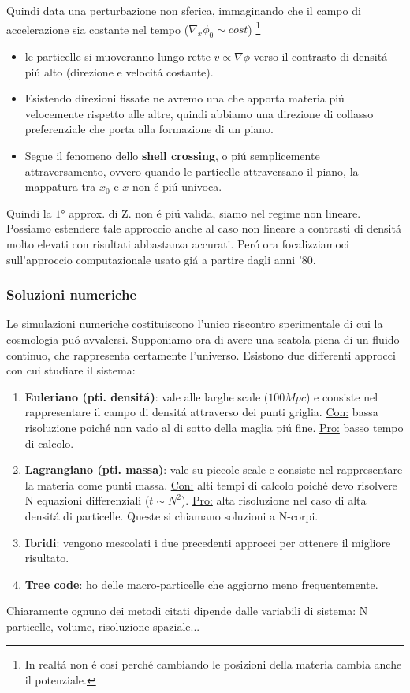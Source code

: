 \documentclass[12pt, a4paper]{article}
\begin{document}
Quindi data una perturbazione non sferica, immaginando che il campo di accelerazione sia costante nel tempo ($\nabla_x \phi_0 \sim cost$) \footnote{In realt\'{a} non \'{e} cos\'{i} perch\'{e} cambiando le posizioni della materia cambia anche il potenziale.} 
\begin{itemize}
\item le particelle si muoveranno lungo rette $v\propto \nabla\phi$ verso il contrasto di densit\'{a} pi\'{u} alto (direzione e velocit\'{a} costante). 
\item Esistendo direzioni fissate ne avremo una che apporta materia pi\'{u} velocemente rispetto alle altre, quindi abbiamo una direzione di collasso preferenziale che porta alla formazione di un piano.
\item Segue il fenomeno dello \textbf{shell crossing}, o pi\'{u} semplicemente attraversamento, ovvero quando le particelle attraversano il piano, la mappatura tra $x_0$ e $x$ non \'{e} pi\'{u} univoca.
\end{itemize}
Quindi la $1°$ approx. di Z. non \'{e} pi\'{u} valida, siamo nel regime non lineare. Possiamo estendere tale approccio anche al caso non lineare a contrasti di densit\'{a} molto elevati con risultati abbastanza accurati. Per\'{o} ora focalizziamoci sull'approccio computazionale usato gi\'{a} a partire dagli anni '80.
\subsubsection{Soluzioni numeriche}
Le simulazioni numeriche costituiscono l'unico riscontro sperimentale di cui la cosmologia pu\'{o} avvalersi. Supponiamo ora  di avere una scatola piena di un fluido continuo, che rappresenta certamente l'universo. Esistono due differenti approcci con cui studiare il sistema:
\begin{enumerate}
\item \textbf{Euleriano (pti. densit\'{a})}: vale alle larghe scale ($100 Mpc$) e consiste nel rappresentare il campo di densit\'{a} attraverso dei punti griglia. \underline{Con:} bassa risoluzione poich\'{e} non vado al di sotto della maglia pi\'{u} fine. \underline{Pro:} basso tempo di calcolo. 
\item \textbf{Lagrangiano (pti. massa)}: vale su piccole scale e consiste nel rappresentare la materia come punti massa. \underline{Con:} alti tempi di calcolo poich\'{e} devo risolvere N equazioni differenziali ($t\sim N^2$). \underline{Pro:} alta risoluzione nel caso di alta densit\'{a} di particelle. Queste si chiamano soluzioni a N-corpi.
\item \textbf{Ibridi}: vengono mescolati i due precedenti approcci per ottenere il migliore risultato.
\item \textbf{Tree code}: ho delle macro-particelle che aggiorno meno frequentemente.
\end{enumerate}
Chiaramente ognuno dei metodi citati dipende dalle variabili di sistema: N particelle, volume, risoluzione spaziale...
\end{document}
